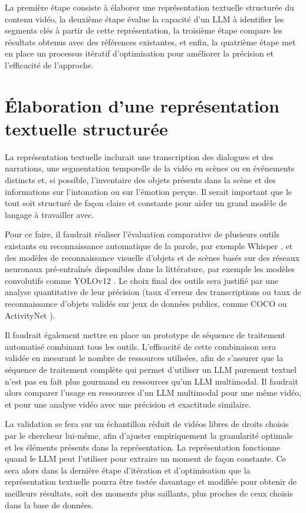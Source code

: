 \documentclass[livre]{udes-genie-these}
\begin{document}
La première étape consiste à élaborer une représentation textuelle structurée du contenu vidéo, la deuxième étape évalue la capacité d'un LLM à identifier les segments clés à partir de cette représentation, la troisième étape compare les résultats obtenus avec des références existantes, et enfin, la quatrième étape met en place un processus itératif d'optimisation pour améliorer la précision et l'efficacité de l'approche.

\section{Élaboration d'une représentation textuelle structurée}

La représentation textuelle inclurait une transcription des dialogues et des narrations, une segmentation temporelle de la vidéo en scènes ou en événements distincts et, si possible, l'inventaire des objets présents dans la scène et des informations sur l'intonation ou sur l'émotion perçue. Il serait important que le tout soit structuré de façon claire et constante pour aider un grand modèle de langage à travailler avec.

Pour ce faire, il faudrait réaliser l'évaluation comparative de plusieurs outils existants en reconnaissance automatique de la parole, par exemple Whisper \cite{radford2023_whisper}, et des modèles de reconnaissance visuelle d'objets et de scènes basés sur des réseaux neuronaux pré-entraînés disponibles dans la littérature, par exemple les modèles convolutifs comme YOLOv12 \cite{tian2025yolov12}. Le choix final des outils sera justifié par une analyse quantitative de leur précision (taux d'erreur des transcriptions ou taux de reconnaissance d'objets validés sur jeux de données publics, comme COCO \cite{lin2014_coco} ou ActivityNet \cite{heilbron2015_activitynet}). 

Il faudrait également mettre en place un prototype de séquence de traitement automatisé combinant tous les outils. L'efficacité de cette combinaison sera validée en mesurant le nombre de ressources utilisées, afin de s'assurer que la séquence de traitement complète qui permet d'utiliser un LLM purement textuel n'est pas en fait plus gourmand en ressources qu'un LLM multimodal. Il faudrait alors comparer l'usage en ressources d'un LLM multimodal pour une même vidéo, et pour une analyse vidéo avec une précision et exactitude similaire. 

La validation se fera sur un échantillon réduit de vidéos libres de droits choisis par le chercheur lui-même, afin d'ajuster empiriquement la granularité optimale et les éléments présents dans la représentation. La représentation fonctionne quand le LLM peut l'utiliser pour extraire un moment de façon constante. Ce sera alors dans la dernière étape d'itération et d'optimisation que la représentation textuelle pourra être testée davantage et modifiée pour obtenir de meilleurs résultats, soit des moments plus saillants, plus proches de ceux choisis dans la base de données.
\end{document}

